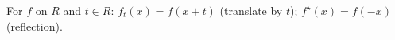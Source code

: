 For $f$ on $R$ and $t \in R$: $f_t(x) = f(x + t)$ (translate by $t$); $f^{\star}(x) = f(-x)$ (reflection).
